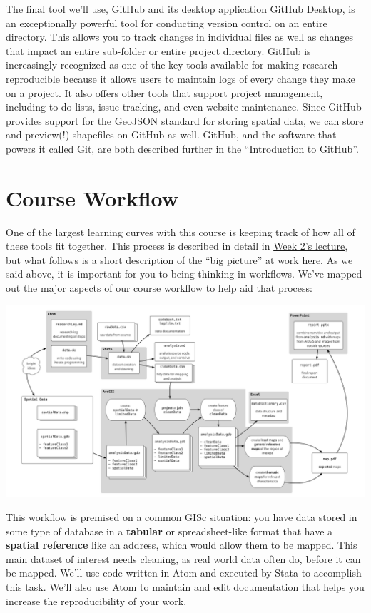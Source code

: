 \documentclass[]{book}
\theoremstyle{definition}
\theoremstyle{definition}
\theoremstyle{remark}
\begin{document}
The final tool we'll use, GitHub and its desktop application GitHub
Desktop, is an exceptionally powerful tool for conducting version
control on an entire directory. This allows you to track changes in
individual files as well as changes that impact an entire sub-folder or
entire project directory. GitHub is increasingly recognized as one of
the key tools available for making research reproducible because it
allows users to maintain logs of every change they make on a project. It
also offers other tools that support project management, including to-do
lists, issue tracking, and even website maintenance. Since GitHub
provides support for the \href{http://geojson.org}{GeoJSON} standard for
storing spatial data, we can store and preview(!) shapefiles on GitHub
as well. GitHub, and the software that powers it called Git, are both
described further in the ``Introduction to GitHub''.

\section{Course Workflow}\label{course-workflow}

One of the largest learning curves with this course is keeping track of
how all of these tools fit together. This process is described in detail
in \href{https://github.com/slu-soc5650/week-02}{Week 2's lecture}, but
what follows is a short description of the ``big picture'' at work here.
As we said above, it is important for you to being thinking in
workflows. We've mapped out the major aspects of our course workflow to
help aid that process:

\includegraphics[width=1\linewidth]{images/gisFlow1}

This workflow is premised on a common GISc situation: you have data
stored in some type of database in a \textbf{tabular} or
spreadsheet-like format that have a \textbf{spatial reference} like an
address, which would allow them to be mapped. This main dataset of
interest needs cleaning, as real world data often do, before it can be
mapped. We'll use code written in Atom and executed by Stata to
accomplish this task. We'll also use Atom to maintain and edit
documentation that helps you increase the reproducibility of your work.
\end{document}
